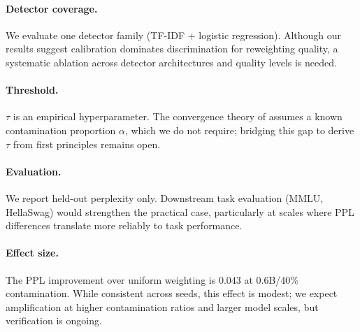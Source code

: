 \paragraph{Detector coverage.}
We evaluate one detector family (TF-IDF + logistic regression).
Although our results suggest calibration dominates discrimination for reweighting quality, a systematic ablation across detector architectures and quality levels is needed.

\paragraph{Threshold.}
$\tau$ is an empirical hyperparameter.
The convergence theory of \citet{wang_2026_survive_contamination} assumes a known contamination proportion $\alpha$, which we do not require; bridging this gap to derive $\tau$ from first principles remains open.

\paragraph{Evaluation.}
We report held-out perplexity only.
Downstream task evaluation (MMLU, HellaSwag) would strengthen the practical case, particularly at scales where PPL differences translate more reliably to task performance.

\paragraph{Effect size.}
The PPL improvement over uniform weighting is 0.043 at 0.6B/40\% contamination.
While consistent across seeds, this effect is modest; we expect amplification at higher contamination ratios and larger model scales, but verification is ongoing.
